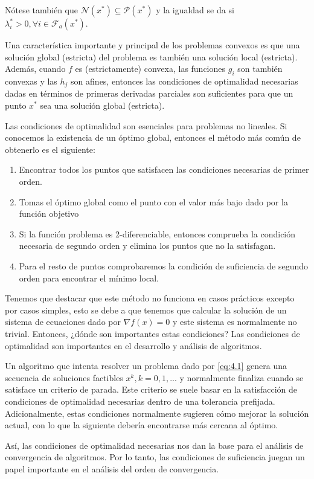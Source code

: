 Nótese también que $\mathcal{N}(x^*) \subseteq\mathcal{P}(x^*)$  y la igualdad se da si $\lambda_i^* >0, \forall i\in\mathcal{F}_a(x^*)$.

Una característica importante y principal de los problemas convexos es que una solución global (estricta) del problema es también una solución local (estricta). 
Además, cuando $f$ es (estrictamente) convexa, las funciones $g_i$ son también convexas y las $h_j$ son afines, entonces las condiciones de optimalidad necesarias dadas en términos de primeras derivadas parciales son suficientes para que un punto $x^*$ sea una solución global (estricta).

Las condiciones de optimalidad son esenciales para problemas no lineales. 
Si conocemos la existencia de un óptimo global, entonces el método más común de obtenerlo es el siguiente:
\begin{enumerate}
	\item Encontrar todos los puntos que satisfacen las condiciones necesarias de primer orden.
	\item Tomas el óptimo global como el punto con el valor más bajo dado por la función objetivo
	\item Si la función problema es 2-diferenciable, entonces comprueba la condición necesaria de segundo orden y elimina los puntos que no la satisfagan.
	\item Para el resto de puntos comprobaremos la condición de suficiencia de segundo orden para encontrar el mínimo local.
\end{enumerate}

Tenemos que destacar que este método no funciona en casos prácticos excepto por casos simples, esto se debe a que tenemos que calcular la solución de un sistema de ecuaciones dado por $\nabla f(x)=0$ y este sistema es normalmente no trivial. 
Entonces, ¿dónde son importantes estas condiciones? 
Las condiciones de optimalidad son importantes en el desarrollo y análisis de algoritmos.

Un algoritmo que intenta resolver un problema dado por \ref{eq:4.1} genera una secuencia de soluciones factibles $x^k, k=0,1,...$ y normalmente finaliza cuando se satisface un criterio de parada. 
Este criterio se suele basar en la satisfacción de condiciones de optimalidad necesarias dentro de una tolerancia prefijada. 
Adicionalmente, estas condiciones normalmente sugieren cómo mejorar la solución actual, con lo que la siguiente debería encontrarse más cercana al óptimo.

Así, las condiciones de optimalidad necesarias nos dan la base para el análisis de convergencia de algoritmos. 
Por lo tanto, las condiciones de suficiencia juegan un papel importante en el análisis del orden de convergencia.

